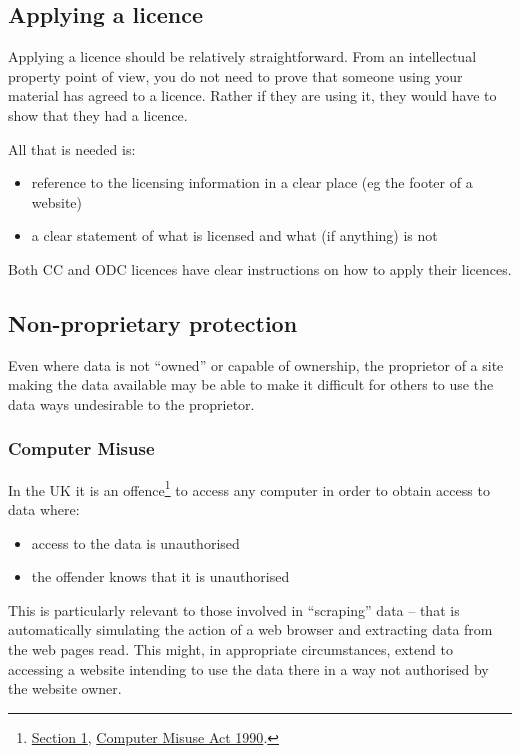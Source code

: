 \subsection{Applying a licence}\label{applying-a-licence}

Applying a licence should be relatively straightforward. From an
intellectual property point of view, you do not need to prove that
someone using your material has agreed to a licence. Rather if they are
using it, they would have to show that they had a licence.

All that is needed is:

\begin{itemize}
\item
  reference to the licensing information in a clear place (eg the footer
  of a website)
\item
  a clear statement of what is licensed and what (if anything) is not
\end{itemize}

Both CC and ODC licences have clear instructions on how to apply their
licences.

\subsection{Non-proprietary
protection}\label{non-proprietary-protection}

Even where data is not ``owned'' or capable of ownership, the proprietor
of a site making the data available may be able to make it difficult for
others to use the data ways undesirable to the proprietor.

\subsubsection{Computer Misuse}\label{computer-misuse}

In the UK it is an offence\footnote{\href{http://www.legislation.gov.uk/ukpga/1990/18/section/1}{Section
  1},
  \href{http://www.legislation.gov.uk/ukpga/1990/18/contents}{Computer
  Misuse Act 1990}.} to access any computer in order to obtain access to
data where:

\begin{itemize}
\item
  access to the data is unauthorised
\item
  the offender knows that it is unauthorised
\end{itemize}

This is particularly relevant to those involved in ``scraping'' data --
that is automatically simulating the action of a web browser and
extracting data from the web pages read. This might, in appropriate
circumstances, extend to accessing a website intending to use the data
there in a way not authorised by the website owner.

